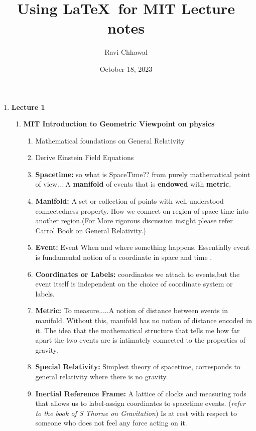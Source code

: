 \documentclass[11pt,a4paper]{article}
\title{Using \LaTeX\ for MIT Lecture notes}
\author{Ravi Chhawal}
\date{October 18, 2023}
\begin{document}
\maketitle

\begin{enumerate}
	\item \textbf{\LARGE Lecture 1}
	      \begin{enumerate}
		      \item \textbf{\Large MIT Introduction to Geometric Viewpoint on physics}
		            \begin{enumerate}
			            \item Mathematical foundations on General Relativity
			            \item Derive Einstein Field Equations
			            \item {\textbf{Spacetime:}} so what is SpaceTime?? from purely mathematical
			                  point of view... A \colorbox{blue!30}{\textbf{manifold}} of events that is \colorbox{blue!30}{\textbf{endowed}} with \colorbox{blue!30}{\textbf{metric}}.
			            \item \textbf{Manifold: }  A set or collection of points with well-understood connectedness property. How we connect on region of space time into another region.(For More rigorous discussion insight please refer Carrol Book on General Relativity.)
			            \item \textbf{Event: } Event  When and where something happens. Essentially event is fundamental notion of a coordinate in space and time .
			            \item \textbf{Coordinates or Labels:} coordinates we attach to events,but the event itself is independent on the choice of coordinate system or labels.
			            \item \textbf{Metric:} To measure.....A notion of distance between events in manifold. Without this, manifold has no notion of distance encoded in it. The idea that the mathematical structure that tells me how far apart the two events are is intimately connected to the properties of gravity.
			            \item \textbf{Special Relativity:} Simplest theory of spacetime, corresponds to general relativity where there is no gravity.
			            \item \textbf{Inertial Reference Frame:} A lattice of clocks and measuring rods that allows us to label-assign coordinates to spacetime events. (\textit{refer to the book of S Thorne on Gravitation}) Is at rest with respect to someone who does not feel any force acting on it.\\

\end{enumerate}
\end{enumerate}
\end{enumerate}
\end{document}
